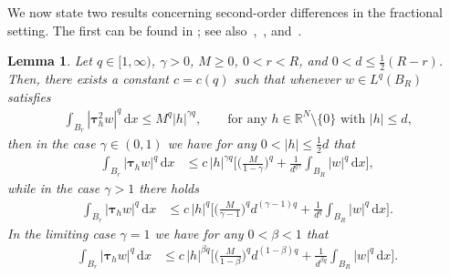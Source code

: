 \documentclass[10pt,letterpaper]{amsart}
\newtheorem{lemma}[theorem]{Lemma}
\theoremstyle{definition}
\numberwithin{theorem}{section}
\numberwithin{equation}{section}
\newcommand{\R}{\ensuremath{\mathbb{R}}}
\newcommand{\1}{\ensuremath{\mathds{1}}}
\newcommand{\dx}{\mathrm{d}x}
\numberwithin{equation}{section}
\begin{document}

We now state two results concerning second-order differences in the fractional setting. The first can be found in \cite[Chapter 5]{Stein}; see also~\cite[Lemma 2.2.1]{Domokos-1},~\cite[Proposition 2.4]{Brasco-Lindgren}, and~\cite[Lemma 2.17]{BDLMS-1}.



\begin{lemma} \label{lem:Domokos}
Let $q\in [1,\infty)$, $\gamma>0$, $M\ge 0$, $0<r<R$, and $0<d\le \tfrac1{2}(R-r)$. Then, there exists a constant $c=c(q)$ such that whenever  $w\in L^q(B_R)$ satisfies
\begin{align*}%
    \int_{B_r} |\boldsymbol{\tau}^2_h w|^q \,\dx 
    \le 
    M^q|h|^{\gamma q},
    \qquad \mbox{for any $h\in\R^N\setminus\{0\}$ with $|h|\le d$,}
\end{align*}
then in the  case $\gamma\in (0,1)$ we have for any $ 0<|h|\le \tfrac12 d$ that
\begin{align*}%
     \int_{B_r} |\boldsymbol{\tau}_hw|^q  \,\dx
     &\le
     c\, |h|^{\gamma q}
     \Bigg[\Big( \frac{M}{1-\gamma}\Big)^q +\frac{1}{d^{q\gamma }}
     \int_{B_R}|w|^q\,\dx
     \Bigg]
     ,
\end{align*}
while in the case $\gamma >1$ there holds
\begin{align}\label{est-1st-diffquot>1}  
     \int_{B_r} |\boldsymbol{\tau}_hw|^q  \,\dx
     &\le
     c\,|h|^q\bigg[
      \Big(\frac{M }{\gamma -1}\Big)^qd^{(\gamma-1)q}
      +
        \frac1{d^q}
        \int_{B_R}|w|^q\,\dx
      \bigg].
\end{align}
In the limiting case $\gamma =1$  we have for any $0<\beta<1$ that
\begin{align*}%
     \int_{B_r} |\boldsymbol{\tau}_hw|^q  \,\dx
     &\le
      c\, |h|^{\beta q}
     \bigg[
     \Big(\frac{ M}{1-\beta}\Big)^q d^{(1-\beta)q}+\frac{1}{d^{\beta q}} \int_{B_R}|w|^q\,\dx\bigg].
\end{align*}
\end{lemma}
\end{document}
